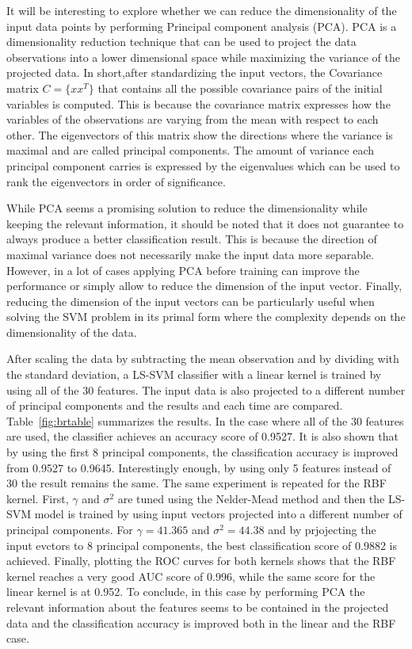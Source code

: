 \documentclass{article}
\begin{document}
It will be interesting to explore whether we can reduce the dimensionality of the input data points by performing Principal component analysis (PCA). PCA is a dimensionality reduction technique that can be used to project the data observations into a lower dimensional space while maximizing the variance of the projected data. In short,after standardizing the input vectors, the Covariance matrix $C=\{xx^T\}$ that contains all the possible covariance pairs of the initial variables is computed. This is because the covariance matrix expresses how the variables of the observations are varying from the mean with respect to each other. The eigenvectors of this matrix show the directions where the variance is maximal and are called principal components. The amount of variance each principal component carries is expressed by the eigenvalues which can be used to rank the eigenvectors in order of significance. 

While PCA seems a promising solution to reduce the dimensionality while keeping the relevant information, it should be noted that it does not guarantee to always produce a better classification result. This is because the direction of maximal variance does not necessarily make the input data more separable. However, in a lot of cases applying PCA before training can improve the performance or simply allow to reduce the dimension of the input vector. Finally, reducing the dimension of the input vectors can be particularly useful when solving the SVM problem in its primal form where the complexity depends on the dimensionality of the data.

After scaling the data by subtracting the mean observation and by dividing with the standard deviation, a LS-SVM classifier with a linear kernel is trained by using all of the 30 features. The input data is also projected to a different number of principal components and the results and each time  are compared. Table~\ref{fig:brtable} summarizes the results. In the case where all of the 30 features are used, the classifier achieves an accuracy score of 0.9527. It is also shown that by using the first 8 principal components, the classification accuracy is improved from 0.9527 to 0.9645. Interestingly enough, by using only 5 features instead of 30 the result remains the same. The same experiment is repeated for the RBF kernel. First, $\gamma$ and $\sigma^2$ are tuned using the Nelder-Mead method and then the LS-SVM model is trained by using input vectors projected into a different number of principal components. For $\gamma=41.365$ and $\sigma^2=44.38$ and by prjojecting the input evctors to 8 principal components, the best classification score of 0.9882 is achieved. Finally, plotting the ROC curves for both kernels shows that the RBF kernel reaches a very good AUC score of 0.996, while the same score for the linear kernel is at 0.952. To conclude, in this case by performing PCA the relevant information about the features seems to be contained in the projected data and the classification accuracy is improved both in the linear and the RBF case.
\end{document}
